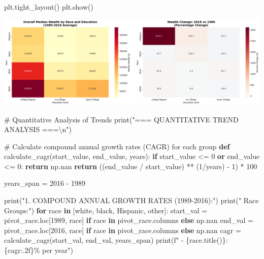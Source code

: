 \documentclass[
  letterpaper,
  DIV=11,
  numbers=noendperiod]{scrartcl}
\newenvironment{Shaded}{\begin{snugshade}}{\end{snugshade}}
\newcommand{\BuiltInTok}[1]{\textcolor[rgb]{0.00,0.23,0.31}{#1}}
\newcommand{\CharTok}[1]{\textcolor[rgb]{0.13,0.47,0.30}{#1}}
\newcommand{\CommentTok}[1]{\textcolor[rgb]{0.37,0.37,0.37}{#1}}
\newcommand{\ControlFlowTok}[1]{\textcolor[rgb]{0.00,0.23,0.31}{\textbf{#1}}}
\newcommand{\DecValTok}[1]{\textcolor[rgb]{0.68,0.00,0.00}{#1}}
\newcommand{\KeywordTok}[1]{\textcolor[rgb]{0.00,0.23,0.31}{\textbf{#1}}}
\newcommand{\NormalTok}[1]{\textcolor[rgb]{0.00,0.23,0.31}{#1}}
\newcommand{\OperatorTok}[1]{\textcolor[rgb]{0.37,0.37,0.37}{#1}}
\newcommand{\SpecialCharTok}[1]{\textcolor[rgb]{0.37,0.37,0.37}{#1}}
\newcommand{\SpecialStringTok}[1]{\textcolor[rgb]{0.13,0.47,0.30}{#1}}
\newcommand{\StringTok}[1]{\textcolor[rgb]{0.13,0.47,0.30}{#1}}
\begin{document}
\begin{Shaded}
\begin{Highlighting}[]
\NormalTok{plt.tight\_layout()}
\NormalTok{plt.show()}
\end{Highlighting}
\end{Shaded}

\includegraphics{main_files/figure-pdf/cell-11-output-1.png}

\begin{Shaded}
\begin{Highlighting}[]
\CommentTok{\# Quantitative Analysis of Trends}
\BuiltInTok{print}\NormalTok{(}\StringTok{"=== QUANTITATIVE TREND ANALYSIS ===}\CharTok{\textbackslash{}n}\StringTok{"}\NormalTok{)}

\CommentTok{\# Calculate compound annual growth rates (CAGR) for each group}
\KeywordTok{def}\NormalTok{ calculate\_cagr(start\_value, end\_value, years):}
    \ControlFlowTok{if}\NormalTok{ start\_value }\OperatorTok{\textless{}=} \DecValTok{0} \KeywordTok{or}\NormalTok{ end\_value }\OperatorTok{\textless{}=} \DecValTok{0}\NormalTok{:}
        \ControlFlowTok{return}\NormalTok{ np.nan}
    \ControlFlowTok{return}\NormalTok{ ((end\_value }\OperatorTok{/}\NormalTok{ start\_value) }\OperatorTok{**}\NormalTok{ (}\DecValTok{1}\OperatorTok{/}\NormalTok{years) }\OperatorTok{{-}} \DecValTok{1}\NormalTok{) }\OperatorTok{*} \DecValTok{100}

\NormalTok{years\_span }\OperatorTok{=} \DecValTok{2016} \OperatorTok{{-}} \DecValTok{1989}

\BuiltInTok{print}\NormalTok{(}\StringTok{"1. COMPOUND ANNUAL GROWTH RATES (1989{-}2016):"}\NormalTok{)}
\BuiltInTok{print}\NormalTok{(}\StringTok{"   Race Groups:"}\NormalTok{)}
\ControlFlowTok{for}\NormalTok{ race }\KeywordTok{in}\NormalTok{ [}\StringTok{\textquotesingle{}white\textquotesingle{}}\NormalTok{, }\StringTok{\textquotesingle{}black\textquotesingle{}}\NormalTok{, }\StringTok{\textquotesingle{}Hispanic\textquotesingle{}}\NormalTok{, }\StringTok{\textquotesingle{}other\textquotesingle{}}\NormalTok{]:}
\NormalTok{    start\_val }\OperatorTok{=}\NormalTok{ pivot\_race.loc[}\DecValTok{1989}\NormalTok{, race] }\ControlFlowTok{if}\NormalTok{ race }\KeywordTok{in}\NormalTok{ pivot\_race.columns }\ControlFlowTok{else}\NormalTok{ np.nan}
\NormalTok{    end\_val }\OperatorTok{=}\NormalTok{ pivot\_race.loc[}\DecValTok{2016}\NormalTok{, race] }\ControlFlowTok{if}\NormalTok{ race }\KeywordTok{in}\NormalTok{ pivot\_race.columns }\ControlFlowTok{else}\NormalTok{ np.nan}
\NormalTok{    cagr }\OperatorTok{=}\NormalTok{ calculate\_cagr(start\_val, end\_val, years\_span)}
    \BuiltInTok{print}\NormalTok{(}\SpecialStringTok{f"   {-} }\SpecialCharTok{\{}\NormalTok{race}\SpecialCharTok{.}\NormalTok{title()}\SpecialCharTok{\}}\SpecialStringTok{: }\SpecialCharTok{\{}\NormalTok{cagr}\SpecialCharTok{:.2f\}}\SpecialStringTok{\% per year"}\NormalTok{)}


\end{Highlighting}
\end{Shaded}
\end{document}
